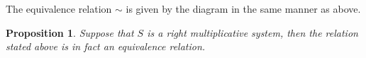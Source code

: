 \documentclass[12pt]{article}
\newtheorem{prop}[theorem]{Proposition}
\theoremstyle{definition}
\theoremstyle{remark}
\begin{document}
            The equivalence relation $\sim$ is given by the diagram in the same manner as above.
            \begin{center}
            \end{center}

            \begin{prop}
                Suppose that $S$ is a right multiplicative system, then the relation stated above is in fact an equivalence relation.
            \end{prop}
\end{document}
